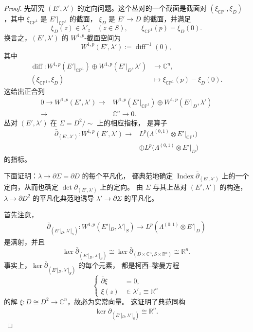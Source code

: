 \begin{proof}
先研究 $(E',\lambda')$ 的定向问题。这个丛对的一个截面是截面对
$(\xi_{\mathbb{CP}^1},\xi_D)$，其中
$\xi_{\mathbb{CP}^1}$ 是 $E'|_{\mathbb{CP}^1}$ 的截面，
$\xi_D$ 是 $E'\to D$ 的截面，并满足
\[
\xi_D(z)\in\lambda'_z\quad(z\in S),
\qquad
\xi_{\mathbb{CP}^1}(p)=\xi_D(0).
\]
换言之，$(E',\lambda')$ 的 $W^{1,p}$-截面空间为
\[
W^{1,p}(E',\lambda'):=\operatorname{diff}^{-1}(0),
\]
其中
\[
\begin{split}
\operatorname{diff}\colon{}
W^{1,p}(E'|_{\mathbb{CP}^1})\oplus
W^{1,p}(E'|_D,\lambda')&\longrightarrow\mathbb C^n,\\
(\xi_{\mathbb{CP}^1},\xi_D)&\longmapsto
\xi_{\mathbb{CP}^1}(p)-\xi_D(0).
\end{split}
\]
这给出正合列
\[
\begin{split}
0\longrightarrow W^{1,p}(E',\lambda')
\longrightarrow{}&W^{1,p}(E'|_{\mathbb{CP}^1})
 \oplus W^{1,p}(E'|_D,\lambda')\\
\longrightarrow{}&\mathbb C^n\longrightarrow0.
\end{split}
\]
丛对 $(E',\lambda')$ 在 $\Sigma=D^2/\!\sim$ 上的相应指标，
是算子
\[
\begin{split}
\bar\partial_{(E',\lambda')}\colon
W^{1,p}(E',\lambda')\longrightarrow{}
&L^p\bigl(\Lambda^{(0,1)}\otimes E'|_{\mathbb{CP}^1}\bigr)\\
&\oplus L^p\bigl(\Lambda^{(0,1)}\otimes E'|_D\bigr)
\end{split}
\]
的指标。

下面证明：$\lambda\to\partial\Sigma=\partial D$ 的每个平凡化，
都典范地确定 $\operatorname{Index}\bar\partial_{(E',\lambda')}$
上的一个定向，从而也确定
$\det\bar\partial_{(E',\lambda')}$ 上的定向。
由 $\Sigma$ 与其上丛对 $(E',\lambda')$ 的构造，
$\lambda\to\partial D^2$ 的平凡化典范地诱导
$\lambda'\to\partial\Sigma$ 的平凡化。

首先注意，
\[
\begin{split}
\bar\partial_{(E'|_D,\lambda'|_S)}\colon
W^{1,p}(E'|_D,\lambda'|_S)
\longrightarrow L^p(\Lambda^{(0,1)}\otimes E'|_D)
\end{split}
\]
是满射，并且
\[
\ker\bar\partial_{(E'|_D,\lambda'|_S)}
\cong\ker\bar\partial_{(D\times\mathbb C^n,S\times\mathbb R^n)}
\cong\mathbb R^n.
\]
事实上，$\ker\bar\partial_{(E'|_D,\lambda'|_S)}$ 的每个元素，
都是柯西--黎曼方程
\[
\left\{
\begin{aligned}
\bar\partial\xi&=0,\\
\xi(z)&\in\lambda'_z\equiv\mathbb R^n
\end{aligned}
\right.
\]
的解 $\xi\colon D\cong D^2\to\mathbb C^n$，故必为实常向量。
这证明了典范同构
\[
\ker\bar\partial_{(E'|_D,\lambda'|_S)}\cong\mathbb R^n.
\]


\end{proof}
